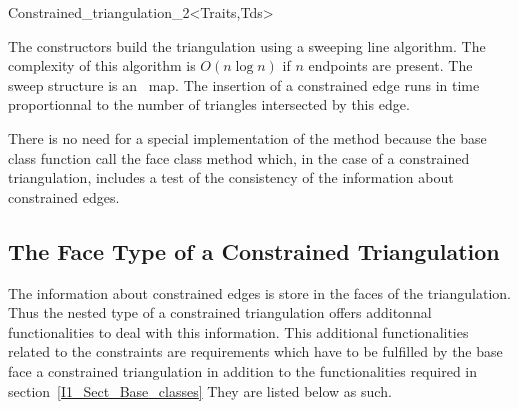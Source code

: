 \begin{ccClassTemplate} {Constrained_triangulation_2<Traits,Tds>}

The constructors build the triangulation using a sweeping line
algorithm. The complexity of this algorithm is $O(n\log n)$ if $n$
endpoints are present. The sweep structure is an \stl\ map.
 The insertion of a constrained edge runs in time
proportionnal to the number of triangles intersected by this edge.

There is no need for a special implementation
of the method \ccVar{}
because the base class function
call the face class method
which, in the case of a constrained triangulation,
includes a test of the consistency of the
information about constrained edges.
\end{ccClassTemplate}

\subsection{The Face Type of a Constrained Triangulation}
\label{I1_Sect_Constrained_face}
 The information about constrained edges is store in the 
faces of the triangulation. Thus the nested 
type of a constrained triangulation offers
additonnal functionalities to deal with this information.
This additional functionalities related to the constraints
are requirements which have to be fulfilled
by the base face  a constrained triangulation
in addition to the functionalities required in section~\ref{I1_Sect_Base_classes}
They are listed below as such.

